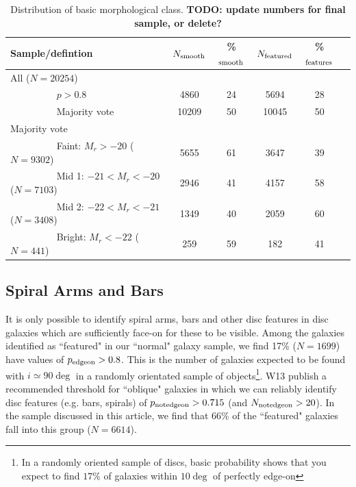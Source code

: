 \documentclass[usenatbib]{mn2e}
\begin{document}
\begin{table}
\caption{Distribution of basic morphological class\label{basic}. {\bf TODO: update numbers for final sample, or delete?}}
\begin{tabular}{lccccc}
\hline\hline
Sample/defintion &  $N_{\rm smooth}$ & \%$_{\rm smooth}$ & $N_{\rm featured}$ & \%$_{\rm features}$\\
\hline
All ($N=20254$) \\
~~~~~~~~~ $ p>0.8$ & 4860 &  24 & 5694 &  28 \\
~~~~~~~~~ Majority vote & 10209 &  50 &  10045 & 50\\
Majority vote  \\
~~~~~~~~~ Faint:  $M_r > -20$ ($N=9302$) & 5655 & 61 & 3647 & 39 \\
~~~~~~~~~ Mid 1:  $-21< M_r < -20$ ($N=7103$) & 2946 & 41 & 4157 & 58 \\
~~~~~~~~~ Mid 2:  $-22< M_r  < -21$ ($N=3408$) & 1349 & 40 & 2059 & 60 \\
~~~~~~~~~ Bright:  $M_r < -22$ ($N=441$) & 259 & 59 & 182 &  41\\
\hline\hline
\end{tabular}
\end{table}


\subsection{Spiral Arms and Bars}
 
  It is only possible to identify spiral arms, bars and other disc features in disc galaxies which are sufficiently face-on for these to be visible.  Among the galaxies identified as ``featured" in our ``normal" galaxy sample, we find {17\% ($N=1 699$)} have values of $p_{\rm edge on}>0.8$. This is the number of galaxies expected to be found with $i\simeq90\deg$ in a randomly orientated sample of objects\footnote{In a randomly oriented sample of discs, basic probability shows that you expect to find $17\%$ of galaxies within $10\deg$ of perfectly edge-on}. W13 publish a recommended threshold for ``oblique" galaxies in which we can reliably identify disc features (e.g. bars, spirals) of $p_{\rm not edge on}>0.715$ (and $N_{\rm not edge on}>20$). In the sample discussed in this article, we find that {66}\% of the ``featured" galaxies fall into this group {($N=6 614$)}. 
 
\end{document}
